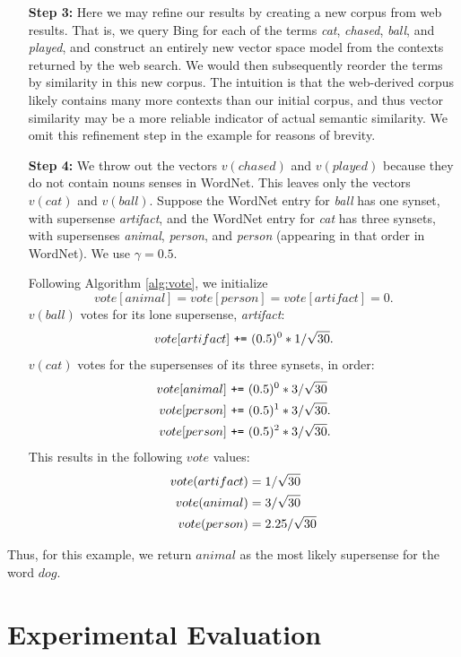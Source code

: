 \documentclass{article}
\begin{document}
\begin{enumerate}
\item[{\bf Step 3:}]
Here we may refine our results by creating a new corpus from web results.
That is, we query Bing for each of the terms {\it cat}, {\it chased}, {\it ball}, and {\it played}, and construct an entirely new vector space model from the contexts returned by the web search.
We would then subsequently reorder the terms by similarity in this new corpus.
The intuition is that the web-derived corpus likely contains many more contexts than our initial corpus, and thus vector similarity may be a more reliable indicator of actual semantic similarity.
We omit this refinement step in the example for reasons of brevity. 

\item[{\bf Step 4:}]
We throw out the vectors $v(chased)$ and $v(played)$ because they do not contain nouns senses in WordNet.
This leaves only the vectors $v(cat)$ and $v(ball)$.
Suppose the WordNet entry for {\it ball} has one synset, with supersense {\it artifact},
and the WordNet entry for {\it cat} has three synsets, with supersenses {\it animal}, {\it person}, and {\it person} (appearing in that order in WordNet).
We use $\gamma = 0.5$.

Following Algorithm \ref{alg:vote}, we initialize 
$$vote[animal] = vote[person] = vote[artifact] = 0.$$
$v(ball)$ votes for its lone supersense, {\it artifact}:
$$vote[artifact]\,\, \verb!+=! \,\, (0.5)^0 * 1/\sqrt {30}.$$
$v(cat)$ votes for the supersenses of its three synsets, in order:
\begin{align}
vote[animal] & \,\, \texttt{+=} \,\, (0.5)^0 * 3/ \sqrt {30} \notag\\
vote[person] & \,\, \texttt{+=} \,\, (0.5)^1 * 3/ \sqrt {30}. \notag \\
vote[person] & \,\, \texttt{+=} \,\, (0.5)^2 * 3/ \sqrt {30}. \notag
\end{align}
This results in the following $vote$ values:
\begin{align}
    vote(artifact) & = 1 / \sqrt{30} \notag\\
    vote(animal) & = 3 / \sqrt{30} \notag\\
    vote(person) & = 2.25 / \sqrt{30} \notag
\end{align}


\end{enumerate}

Thus, for this example, we return $animal$ as the most likely supersense for the word $dog$.


\section{Experimental Evaluation}
\end{document}
